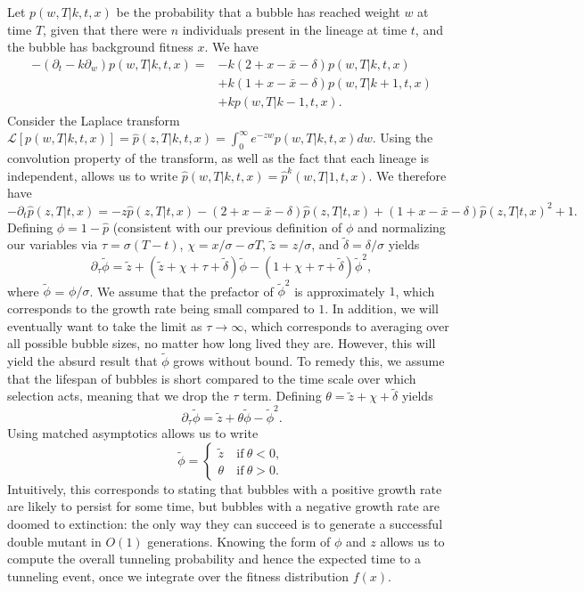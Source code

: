 \documentclass[rmp]{revtex4}
\begin{document}
Let $p(w,T|k,t,x)$ be the probability that a bubble has reached weight $w$ at time $T$, given that there were $n$ individuals present in the lineage at time $t$, and the bubble has background fitness $x$.
We have
\begin{align*}
-(\partial_t -k\partial_w) p(w,T|k,t,x) = &-k(2+x-\bar{x}-\delta)p(w,T|k,t,x) \\
& + k(1+x-\bar{x}-\delta)p(w,T|k+1,t,x) \\
& +kp(w,T|k-1,t,x).
\end{align*}
Consider the Laplace transform $\mathcal{L}\left[ p(w,T|k,t,x) \right] = \hat{p}(z,T|k,t,x) =  \int_0^\infty e^{-zw} p(w,T|k,t,x) dw$.
Using the convolution property of the transform, as well as the fact that each lineage is independent, allows us to write $\hat{p}(w,T|k,t,x) = \hat{p}^k(w,T|1,t,x)$.
We therefore have
\begin{equation}
-\partial_t\hat{p}(z,T|t,x) = -z\hat{p}(z,T|t,x) -(2+x-\bar{x}-\delta)\hat{p}(z,T|t,x) + (1+x-\bar{x}-\delta)\hat{p}(z,T|t,x)^2 + 1.
\end{equation}
Defining $\phi = 1-\hat{p}$ (consistent with our previous definition of $\phi$ and normalizing our variables via $\tau = \sigma(T-t)$, $\chi = x/\sigma-\sigma T$, $\tilde{z} = z/\sigma$, and $\tilde{\delta} = \delta/\sigma$ yields
\begin{equation}
\partial_\tau \tilde{\phi} = \tilde{z} + (\tilde{z} + \chi + \tau + \tilde{\delta})\tilde{\phi} - (1 + \chi + \tau + \tilde{\delta})\tilde{\phi}^2,
\end{equation}
where $\tilde{\phi}$ = $\phi/\sigma$.
We assume that the prefactor of $\tilde{\phi}^2$ is approximately $1$, which corresponds to the growth rate being small compared to $1$.
In addition, we will eventually want to take the limit as $\tau \to \infty$, which corresponds to averaging over all possible bubble sizes, no matter how long lived they are.
However, this will yield the absurd result that $\tilde{\phi}$ grows without bound.
To remedy this, we assume that the lifespan of bubbles is short compared to the time scale over which selection acts, meaning that we drop the $\tau$ term.
Defining $\theta = \tilde{z} + \chi + \tilde{\delta}$ yields
\begin{equation}
\partial_\tau \tilde{\phi} = \tilde{z} + \theta \tilde{\phi} - \tilde{\phi}^2.
\end{equation}
Using matched asymptotics allows us to write
\begin{equation}
\tilde{\phi} = 
\begin{cases}
\tilde{z} &\mathrm{~if~} \theta < 0, \\
\theta &\mathrm{~if~} \theta > 0.
\end{cases}
\end{equation}
Intuitively, this corresponds to stating that bubbles with a positive growth rate are likely to persist for some time, but bubbles with a negative growth rate are doomed to extinction: the only way they can succeed is to generate a successful double mutant in $O(1)$ generations.
Knowing the form of $\phi$ and $z$ allows us to compute the overall tunneling probability and hence the expected time to a tunneling event, once we integrate over the fitness distribution $f(x)$.
\fi
\end{document}
